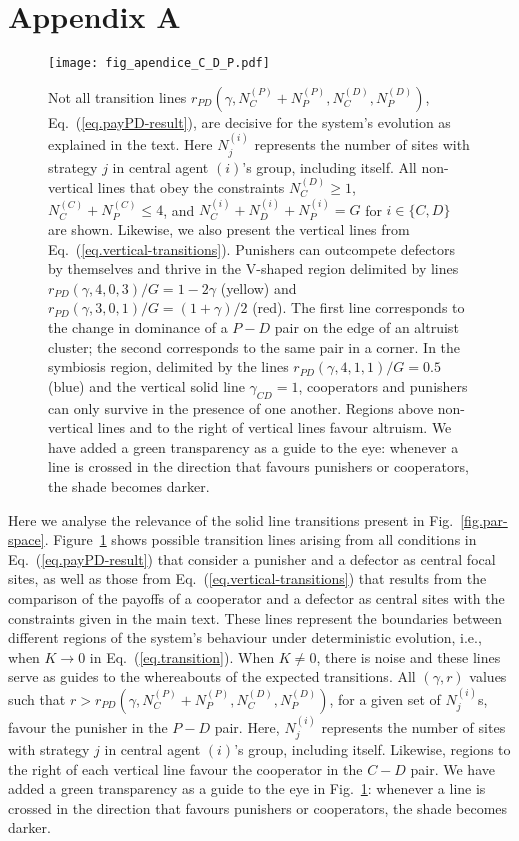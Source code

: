 \documentclass[5p]{elsarticle}
\def\NCC{N^{{\scriptscriptstyle(C)}}_{C}}
\def\NCP{N^{{\scriptscriptstyle(C)}}_{P}}
\def\NDP{N^{{\scriptscriptstyle(D)}}_{P}}
\def\NDC{N^{{\scriptscriptstyle(D)}}_{C}}
\def\NPP{N^{{\scriptscriptstyle(P)}}_{P}}
\def\NPC{N^{{\scriptscriptstyle(P)}}_{C}}
\def\NIJ{N^{{\scriptscriptstyle(i)}}_{j}}
\begin{document}
\section*{Appendix A}
\begin{figure}
\begin{center}
\texttt{[image: fig\_apendice\_C\_D\_P.pdf]}
\caption{Not all transition lines $r_{PD}(\gamma,\NPC+\NPP,\NDC,\NDP)$, Eq.~(\ref{eq.payPD-result}), are decisive for the system's evolution as explained in the text.  Here $\NIJ$  represents the number of sites with strategy  $j$ in central agent $(i)$'s  group, including itself. All non-vertical lines that obey the constraints $\NDC \geq 1 $, $\NCC+\NCP \leq 4$, and $N^{\scriptscriptstyle(i)}_C + N^{\scriptscriptstyle(i)}_D + N^{\scriptscriptstyle(i)}_P=G$ for $i\in\{C,D\}$ are shown.  Likewise, we also present the vertical lines from Eq.~(\ref{eq.vertical-transitions}). Punishers can outcompete defectors by themselves and thrive in the V-shaped region delimited by lines $r_{PD}(\gamma, 4, 0, 3)/G=1-2\gamma$  (yellow) and $r_{PD}(\gamma, 3, 0, 1)/G=(1+\gamma)/2$ (red). The first line corresponds to the change in dominance of a $P-D$ pair on the edge of an altruist cluster; the second corresponds to the same pair in a corner. In the  symbiosis region, delimited by the lines $r_{PD}(\gamma, 4, 1, 1)/G=0.5$ (blue) and the vertical solid line $\gamma_{CD} = 1$, cooperators and punishers can only survive in the presence of one another. Regions above non-vertical lines and to the right of vertical lines favour altruism. We  have  added  a  green  transparency  as  a guide to the eye:  whenever a line is crossed in the  direction  that  favours  punishers  or  cooperators,  the shade becomes darker. }
\label{fig.apend-retas}
\end{center}
\end{figure}

Here we analyse the relevance of the solid line transitions present in Fig.~\ref{fig.par-space}. Figure~\ref{fig.apend-retas} shows possible transition lines arising from all conditions in Eq.~(\ref{eq.payPD-result}) that consider a punisher and a defector as central focal sites, as well as those from Eq.~(\ref{eq.vertical-transitions}) that results from the comparison of the payoffs of a cooperator and a defector as central sites with the constraints given in the main text. These lines  represent the boundaries between  different regions of the system's behaviour under  deterministic evolution, i.e., when $K\to 0$ in Eq.~(\ref{eq.transition}). When $K\neq 0$, there is noise and these lines serve as guides to the whereabouts of the expected transitions.  All $(\gamma,r)$ values  such that  $ r > r_{PD}(\gamma,\NPC+\NPP,\NDC,\NDP)$, for a given set of $N^{(i)}_j$s, favour the punisher in the $P-D$ pair. Here, $\NIJ$  represents the number of sites with strategy  $j$ in central agent $(i)$'s  group, including itself. 
Likewise, regions to the right of each vertical line favour the cooperator in the $C-D$ pair. We have added a green transparency as a guide to the eye in Fig.~\ref{fig.apend-retas}: whenever a line is crossed in the direction that favours punishers or cooperators, the shade becomes darker. 
\end{document}
